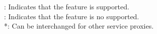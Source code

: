 \begin{table*}[t]
{%

\cmark: Indicates that the feature is supported. \\
\xmark: Indicates that the feature is no supported. \\
*: Can be interchanged for other service proxies.
}
\label{tab:result-proxy}
\end{table*}










